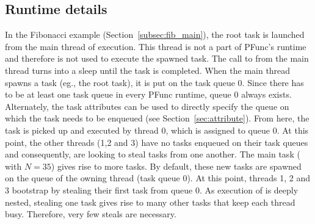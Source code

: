\subsection{Runtime details}
%
In the Fibonacci example (Section~\ref{subsec:fib_main}), the root task is
launched from the main thread of execution. 
%
This thread is not a part of PFunc's runtime and therefore is not used to
execute the spawned task. 
%
The call to  from the main thread turns into a sleep
until the task is completed. 
%
When the main thread spawns a task (eg., the root task), it is put on the task
queue 0. 
%
Since there has to be at least one task queue in every PFunc runtime, queue
0 always exists. 
%
Alternately, the task attributes can be used to directly specify the queue on
which the task needs to be enqueued (see Section~\ref{sec:attribute}). 
%
From here, the task is picked up and executed by thread 0, which is assigned to
queue 0.  
%
At this point, the other threads (1,2 and 3) have no tasks enqueued on their
task queues and consequently, are looking to steal tasks from one another.  
%
The main task ( with $N=35$) gives rise to more tasks. 
%
By default, these new tasks are spawned on the queue of the owning thread (task
queue 0).
%
At this point, threads 1, 2 and 3 bootstrap by stealing their first task from
queue 0. 
%
As execution of  is deeply nested, stealing one task gives
rise to many other tasks that keep each thread busy. 
%
Therefore, very few steals are necessary.
